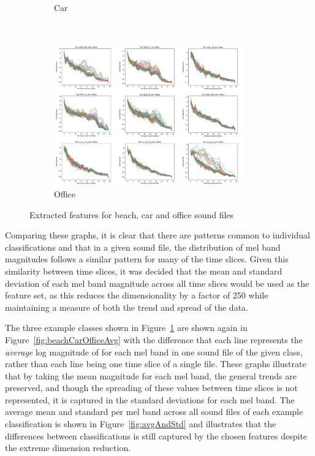 \documentclass[11pt]{article}
\begin{document}
\begin{figure}[!htbp]
\begin{subfigure}[t]{0.54\textwidth}
		\caption{Car}
	\end{subfigure}
	\\
	\vspace{0.2cm}
	\begin{subfigure}[t]{0.54\textwidth}
		\centering
		\includegraphics[width=0.9\textwidth]{figures/officegrid.png}
		\caption{Office}
	\end{subfigure}
	\caption{Extracted features for beach, car and office sound files}
	\label{fig:beachCarOffice}
\end{figure}

Comparing these graphs, it is clear that there are patterns common to individual classifications and that in a given sound file, the distribution of mel band magnitudes follows a similar pattern for many of the time slices. Given this similarity between time slices, it was decided that the mean and standard deviation of each mel band magnitude across all time slices would be used as the feature set, as this reduces the dimensionality by a factor of 250 while maintaining a measure of both the trend and spread of the data.

The three example classes shown in Figure~\ref{fig:beachCarOffice} are shown again in Figure~\ref{fig:beachCarOfficeAvg} with the difference that each line represents the \textit{average} log magnitude of for each mel band in one sound file of the given class, rather than each line being one time slice of a single file. These graphs illustrate that by taking the mean magnitude for each mel band, the general trends are preserved, and though the spreading of these values between time slices is not represented, it is captured in the standard deviations for each mel band. The average mean and standard per mel band across all sound files of each example classification is shown in Figure~\ref{fig:avgAndStd} and illustrates that the differences between classifications is still captured by the chosen features despite the extreme dimension reduction.
\end{document}

